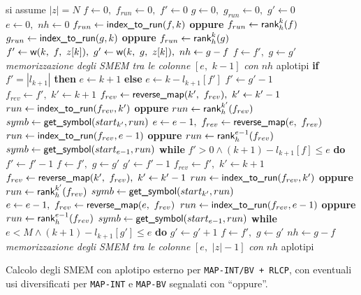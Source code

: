 \begin{algorithm}
  \footnotesize
  \begin{algorithmic}[1]
    \Comment si assume $|z|=N$
    \State $f\gets 0,\,\,f_{run}\gets 0,\,\,f'\gets 0$
    \State $g\gets 0,\,\,g_{run}\gets 0,\,\,g'\gets 0$
    \State $e\gets 0,\,\,nh\gets 0$
    \For {\textit{every} $k\in\left[0,\,\, |z|\right)$}
    \State $f_{run}\gets \mbox{\rm {\sf index\_to\_run}}(f,k)$ \textbf{oppure} $f_{run}\gets
    \mbox{\rm {\sf rank}}_h^k(f)$ 
    \State $g_{run}\gets \mbox{\rm {\sf index\_to\_run}}(g,k)$ \textbf{oppure} $f_{run}\gets
    \mbox{\rm {\sf rank}}_h^k(g)$ 
    \State $f'\gets \mbox{\rm {\sf w}}(k,\,\, f,\,\, z[k]),\,\,g'\gets \mbox{\rm {\sf w}}(k,\,\,
    g,\,\, z[k]),\,\,nh\gets g-f$
    \State $f\gets f',\,\,g\gets g'$
    \Else
    \State \textit{memorizzazione degli SMEM tra le colonne} $[e,\,\, k-1]$
    \textit{con} $nh$ aplotipi
    \EndIf
    \State \textbf{if} $f'=|l_{k+1}|$ \textbf{then} $e\gets k+1$ \textbf{else}
    $e\gets k-l_{k+1}[f']$ 
    \State $f'\gets g'-1$
    \State $f_{rev}\gets f',\,\,k'\gets k+1$
    \State  $f_{rev}\gets \mbox{\rm {\sf reverse\_map}}(k',\,\,f_{rev}),\,\,k'\gets k'-1$
    \EndWhile
    \State $run\gets \mbox{\rm {\sf index\_to\_run}}(f_{rev},k')$ \textbf{oppure} $run\gets
    \mbox{\rm {\sf rank}}_h^{k'}(f_{rev})$
    \State $symb\gets \mbox{\rm {\sf get\_symbol}}(start_{k'}, run)$ 
    \State $e\gets e-1,\,\,f_{rev}\gets \mbox{\rm {\sf reverse\_map}}(e, \,\,f_{rev})$
    \State $run\gets \mbox{\rm {\sf index\_to\_run}}(f_{rev}, e-1)$ \textbf{oppure} $run\gets
    \mbox{\rm {\sf rank}}_h^{e-1}(f_{rev})$
    \State $symb\gets \mbox{\rm {\sf get\_symbol}}(start_{e-1}, run)$ 
    \EndWhile
    \EndIf
    \State \textbf{while} $f'>0\land (k+1)-l_{k+1}[f]\leq e$ \textbf{do}
    $f'\gets f'-1$ 
    \State $f\gets f',\,\,g\gets g'$
    \Else
    \State $g'\gets f'-1$
    \State $f_{rev}\gets f',\,\,k'\gets k+1$
    \State  $f_{rev}\gets \mbox{\rm {\sf reverse\_map}}(k',\,\,f_{rev}),\,\,k'\gets k'-1$
    \EndWhile
    \State $run\gets \mbox{\rm {\sf index\_to\_run}}(f_{rev},k')$ \textbf{oppure} $run\gets
    \mbox{\rm {\sf rank}}_h^{k'}(f_{rev})$
    \State $symb\gets \mbox{\rm {\sf get\_symbol}}(start_{k'}, 
    run)$ 
    \State $e\gets e-1,\,\,f_{rev}\gets \mbox{\rm {\sf reverse\_map}}(e, \,\,f_{rev})$
    \State $run\gets \mbox{\rm {\sf index\_to\_run}}(f_{rev},e-1)$ \textbf{oppure} $run\gets
    \mbox{\rm {\sf rank}}_h^{e-1}(f_{rev})$
    \State $symb\gets \mbox{\rm {\sf get\_symbol}}(start_{e-1}, run)$ 
    \EndWhile
    \EndIf
    \State \textbf{while} $e<M\land (k+1)-l_{k+1}[g']\leq e$ \textbf{do}
    $g'\gets g'+1$  
    \State $f\gets f',\,\,g\gets g'$
    \EndIf
    \EndIf
    \EndFor
    \State $nh\gets g-f$
    \State \textit{memorizzazione degli SMEM tra le colonne} $[e,\,\, |z|-1]$
    \textit{con} $nh$ aplotipi
    \EndIf
    \EndFunction
  \end{algorithmic}
  \caption{\footnotesize{Calcolo degli SMEM con aplotipo esterno per
  \texttt{MAP-INT/BV + RLCP}, con eventuali usi diversificati per
  \texttt{MAP-INT} e \texttt{MAP-BV} segnalati con ``oppure''.}} 
  \label{algo:matchlcp}
\end{algorithm}


